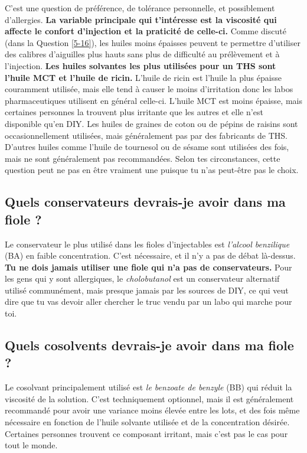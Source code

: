 \documentclass{article}
\begin{document}
C'est une question de préférence, de tolérance personnelle, et possiblement d'allergies. \textbf{La variable principale qui t'intéresse est la viscosité qui affecte le confort d'injection et la praticité de celle-ci.} Comme discuté (dans la Question \ref{5-16}), les huiles moins épaisses peuvent te permettre d'utiliser des calibres d'aiguilles plus hauts sans plus de difficulté au prélèvement et à l'injection. \textbf{Les huiles solvantes les plus utilisées pour un THS sont l'huile MCT et l'huile de ricin.} L'huile de ricin est l'huile la plus épaisse couramment utilisée, mais elle tend à causer le moins d'irritation donc les labos pharmaceutiques utilisent en général celle-ci. L'huile MCT est moins épaisse, mais certaines personnes la trouvent plus irritante que les autres et elle n'est disponible qu'en DIY. Les huiles de graines de coton ou de pépins de raisins sont occasionnellement utilisées, mais généralement pas par des fabricants de THS. D'autres huiles comme l'huile de tournesol ou de sésame sont utilisées des fois, mais ne sont généralement pas recommandées. Selon tes circonstances, cette question peut ne pas en être vraiment une puisque tu n'as peut-être pas le choix.

\subsection{Quels conservateurs devrais-je avoir dans ma fiole ?}\label{6-17}

Le conservateur le plus utilisé dans les fioles d'injectables est \textit{l'alcool benzilique} (BA) en faible concentration. C'est nécessaire, et il n'y a pas de débat là-dessus. \textbf{Tu ne dois jamais utiliser une fiole qui n'a pas de conservateurs.} Pour les gens qui y sont allergiques, le \textit{cholobutanol} est un conservateur alternatif utilisé communément, mais presque jamais par les sources de DIY, ce qui veut dire que tu vas devoir aller chercher le truc vendu par un labo qui marche pour toi.

\subsection{Quels cosolvents devrais-je avoir dans ma fiole ?}

Le cosolvant principalement utilisé est \textit{le benzoate de benzyle} (BB) qui réduit la viscosité de la solution. C'est techniquement optionnel, mais il est généralement recommandé pour avoir une variance moins élevée entre les lots, et des fois même nécessaire en fonction de l'huile solvante utilisée et de la concentration désirée. Certaines personnes trouvent ce composant irritant, mais c'est pas le cas pour tout le monde.
\end{document}
